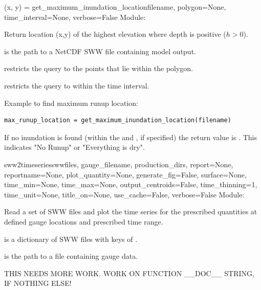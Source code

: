 \documentclass{manual}
\begin{document}
\begin{funcdesc}{(x, y) = get_maximum_inundation_location}{filename,
                                    polygon=None,
                                    time_interval=None,
                                    verbose=False}
Module: 

Return location (x,y) of the highest elevation where depth is positive ($h > 0$).

 is the path to a NetCDF SWW file containing \anuga model output.

 restricts the query to the points that lie within the polygon.

 restricts the query to within the time interval.

Example to find maximum runup location:

\begin{verbatim}
max_runup_location = get_maximum_inundation_location(filename)
\end{verbatim}

If no inundation is found (within the  and , if specified)
the return value is . This indicates "No Runup" or "Everything is dry".
\end{funcdesc}

\begin{funcdesc}{sww2timeseries}{swwfiles,
                                 gauge_filename,
                                 production_dirs,
                                 report=None,
                                 reportname=None,
                                 plot_quantity=None,
                                 generate_fig=False,
                                 surface=None,
                                 time_min=None,
                                 time_max=None,
                                 output_centroids=False,
                                 time_thinning=1,
                                 time_unit=None,
                                 title_on=None,
                                 use_cache=False,
                                 verbose=False}
Module: 

Read a set of SWW files and plot the time series for the prescribed quantities
at defined gauge locations and prescribed time range.

 is a dictionary of SWW files with keys of .

 is the path to a file containing gauge data.

THIS NEEDS MORE WORK.  WORK ON FUNCTION __DOC__ STRING, IF NOTHING ELSE!
\end{funcdesc}
\end{document}
